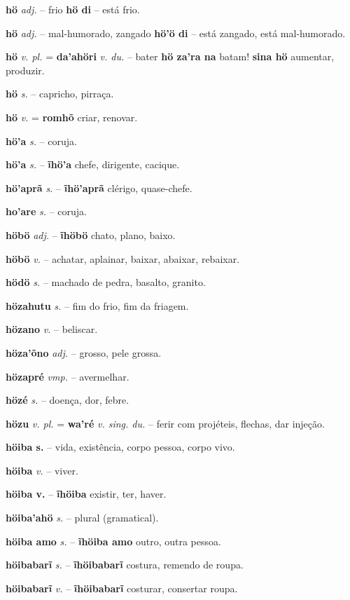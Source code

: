 \textbf{hö} \textit{adj.} -- frio  \textbf{hö di} -- está frio.

\textbf{hö} \textit{adj.} -- mal-humorado, zangado  \textbf{hö'ö di} -- está zangado, está mal-humorado.

\textbf{hö} \textit{v. pl.} = \textbf{da'ahöri} \textit{v. du.} -- bater  \textbf{hö za'ra na} batam! \textbf{sina hö} aumentar, produzir.

\textbf{hö} \textit{s.} -- capricho, pirraça.

\textbf{hö} \textit{v.} = \textbf{romhõ} criar, renovar.

\textbf{hö'a} \textit{s.} -- coruja.

\textbf{hö'a} \textit{s.} -- \textbf{ĩhö'a} chefe, dirigente, cacique.

\textbf{hö'aprã} \textit{s.} -- \textbf{ĩhö'aprã} clérigo, quase-chefe.

\textbf{ho'are} \textit{s.} -- coruja.

\textbf{höbö} \textit{adj.} -- \textbf{ĩhöbö} chato, plano, baixo.

\textbf{höbö} \textit{v.} -- achatar, aplainar, baixar, abaixar, rebaixar.

\textbf{hödö} \textit{s.} -- machado de pedra, basalto, granito.

\textbf{hözahutu} \textit{s.} -- fim do frio, fim da friagem.

\textbf{hözano} \textit{v.} -- beliscar.

\textbf{höza'õno} \textit{adj.} -- grosso, pele grossa.

\textbf{hözapré} \textit{vmp.} -- avermelhar.

\textbf{hözé} \textit{s.} -- doença, dor, febre.

\textbf{hözu} \textit{v. pl.} = \textbf{wa'ré} \textit{v. sing. du.} -- ferir com projéteis, flechas, dar injeção.

\textbf{höiba s.} -- vida, existência, corpo pessoa, corpo vivo.

\textbf{höiba} \textit{v.} -- viver.

\textbf{höiba v.} -- \textbf{ĩhöiba} existir, ter, haver.

\textbf{höiba'ahö} \textit{s.} -- plural (gramatical).

\textbf{höiba amo} \textit{s.} -- \textbf{ĩhöiba amo} outro, outra pessoa.

\textbf{höibabarĩ} \textit{s.} -- \textbf{ĩhöibabarĩ} costura, remendo de roupa.

\textbf{höibabarĩ} \textit{v.} -- \textbf{ĩhöibabarĩ} costurar, consertar roupa.

